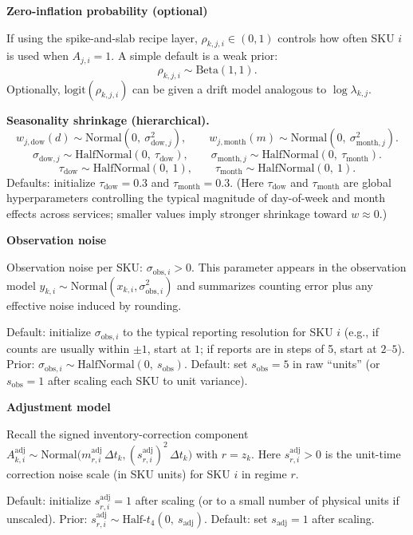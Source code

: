 \documentclass[11pt]{article}
\begin{document}
\textbf{Zero-inflation probability (optional)}

If using the spike-and-slab recipe layer, $\rho_{k,j,i} \in (0,1)$ controls how often SKU $i$ is used when $A_{j,i}=1$.
A simple default is a weak prior:
\[
  \rho_{k,j,i} \sim \text{Beta}(1,1).
\]
Optionally, $\text{logit}(\rho_{k,j,i})$ can be given a drift model analogous to $\log \lambda_{k,j}$.

\textbf{Seasonality shrinkage (hierarchical).}
\[
  w_{j,\text{dow}}(d) \sim \text{Normal}(0,\ \sigma^2_{\text{dow},j}),\qquad
  w_{j,\text{month}}(m) \sim \text{Normal}(0,\ \sigma^2_{\text{month},j}).
\]
\[
  \sigma_{\text{dow},j} \sim \text{HalfNormal}(0,\ \tau_{\text{dow}}),\qquad
  \sigma_{\text{month},j} \sim \text{HalfNormal}(0,\ \tau_{\text{month}}).
\]
\[
  \tau_{\text{dow}} \sim \text{HalfNormal}(0,\ 1),\qquad
  \tau_{\text{month}} \sim \text{HalfNormal}(0,\ 1).
\]
Defaults: initialize $\tau_{\text{dow}}=0.3$ and $\tau_{\text{month}}=0.3$.
(Here $\tau_{\text{dow}}$ and $\tau_{\text{month}}$ are global hyperparameters controlling the typical magnitude of day-of-week and month effects across services; smaller values imply stronger shrinkage toward $w\approx 0$.)

\textbf{Observation noise}

Observation noise per SKU: $\sigma_{\text{obs},i} > 0$.
This parameter appears in the observation model
$y_{k,i}\sim\text{Normal}(x_{k,i},\sigma^2_{\text{obs},i})$ and summarizes counting error plus any effective noise induced by rounding.

Default: initialize $\sigma_{\text{obs},i}$ to the typical reporting resolution for SKU $i$ (e.g., if counts are usually within $\pm 1$, start at $1$; if reports are in steps of 5, start at $2$--$5$).
Prior: $\sigma_{\text{obs},i} \sim \text{HalfNormal}(0,\ s_{\text{obs}})$.
Default: set $s_{\text{obs}}=5$ in raw ``units'' (or $s_{\text{obs}}=1$ after scaling each SKU to unit variance).

\textbf{Adjustment model}

Recall the signed inventory-correction component
$A^{\mathrm{adj}}_{k,i} \sim \text{Normal}\bigl(m^{\mathrm{adj}}_{r,i}\,\Delta t_k,(s^{\mathrm{adj}}_{r,i})^2\,\Delta t_k\bigr)$ with $r=z_k$.
Here $s^{\mathrm{adj}}_{r,i}>0$ is the unit-time correction noise scale (in SKU units) for SKU $i$ in regime $r$.

Default: initialize $s^{\mathrm{adj}}_{r,i}=1$ after scaling (or to a small number of physical units if unscaled).
Prior: $s^{\mathrm{adj}}_{r,i} \sim \text{Half-}t_{4}(0,\ s_{\text{adj}})$.
Default: set $s_{\text{adj}}=1$ after scaling.
\end{document}
